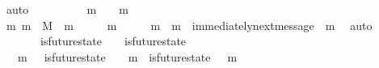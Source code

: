 \begin{isabellebody}
\ auto\isanewline
\ \ \ \ \isamarkupfalse%
\ {\isachardoublequoteopen}{\isasymsigma}\ {\isasymnoteq}\ {\isasymsigma}\ {\isasymunion}\ {\isacharbraceleft}m{}{\isacharbraceright}\ {\isasymand}\ {\isasymsigma}\ {\isasymunion}\ {\isacharbraceleft}m{}{\isacharbraceright}\ {\isasymnoteq}\ {\isasymsigma}{\isacharprime}{\isachardoublequoteclose}\isanewline
\ \ \ \ \ \ \isamarkupfalse%
\ {\isacartoucheopen}{\isacharbraceleft}m{}{\isacharcomma}\ m{}{\isacharbraceright}\ {\isasymsubseteq}\ M\ {\isasymand}\ m{}\ {\isasymin}\ {\isasymsigma}{\isacharprime}\ {\isacharminus}\ {\isasymsigma}\ {\isasymand}\ m{}\ {\isasymin}\ {\isasymsigma}{\isacharprime}\ {\isacharminus}\ {\isasymsigma}\ {\isasymand}\ m{}\ {\isasymnoteq}\ m{}\ {\isasymand}\ immediately{\isacharunderscore}next{\isacharunderscore}message\ {\isacharparenleft}{\isasymsigma}{\isacharcomma}\ m{}{\isacharparenright}{\isacartoucheclose}\ \isamarkupfalse%
\ auto\isanewline
\ \ \ \ \isamarkupfalse%
\ \isamarkupfalse%
\ {\isachardoublequoteopen}\ {\isasymexists}{\isasymsigma}{\isacharprime}{\isacharprime}{\isachardot}\ {\isasymsigma}{\isacharprime}{\isacharprime}\ {\isasymin}\ {\isasymSigma}\ {\isasymand}\ is{\isacharunderscore}future{\isacharunderscore}state\ {\isacharparenleft}{\isasymsigma}{\isacharcomma}\ {\isasymsigma}{\isacharprime}{\isacharprime}{\isacharparenright}\ {\isasymand}\ is{\isacharunderscore}future{\isacharunderscore}state\ {\isacharparenleft}{\isasymsigma}{\isacharprime}{\isacharprime}{\isacharcomma}\ {\isasymsigma}{\isacharprime}{\isacharparenright}\ {\isasymand}\ {\isasymsigma}\ {\isasymnoteq}\ {\isasymsigma}{\isacharprime}{\isacharprime}\ {\isasymand}\ {\isasymsigma}{\isacharprime}{\isacharprime}\ {\isasymnoteq}\ {\isasymsigma}{\isacharprime}{\isachardoublequoteclose}\ \ \ \ \isanewline
\ \ \ \ \ \ \isamarkupfalse%
\ {\isacartoucheopen}{\isasymsigma}\ {\isasymunion}\ {\isacharbraceleft}m{}{\isacharbraceright}\ {\isasymin}\ {\isasymSigma}{\isacartoucheclose}\ {\isacartoucheopen}is{\isacharunderscore}future{\isacharunderscore}state\ {\isacharparenleft}{\isasymsigma}{\isacharcomma}\ {\isasymsigma}\ {\isasymunion}\ {\isacharbraceleft}m{}{\isacharbraceright}{\isacharparenright}\ {\isasymand}\ is{\isacharunderscore}future{\isacharunderscore}state\ {\isacharparenleft}{\isasymsigma}\ {\isasymunion}\ {\isacharbraceleft}m{}{\isacharbraceright}{\isacharcomma}\ {\isasymsigma}{\isacharprime}{\isacharparenright}{\isacartoucheclose}\isanewline

\end{isabellebody}

